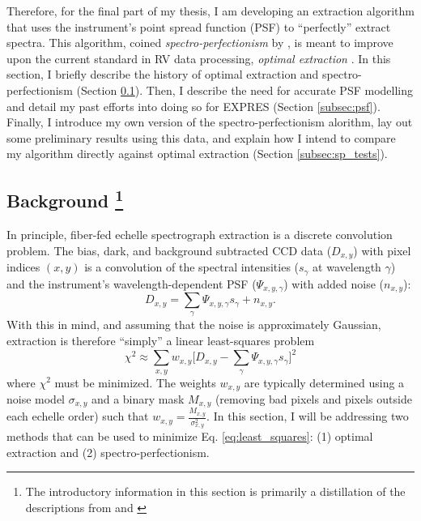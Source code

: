 \documentclass[11pt]{article}
\begin{document}
Therefore, for the final part of my thesis, I am developing an extraction algorithm that uses the instrument's point spread function (PSF) to ``perfectly'' extract spectra. This algorithm, coined \textit{spectro-perfectionism} by \citet{Bolton2009}, is meant to improve upon the current standard in RV data processing, \textit{optimal extraction} \citep{Horne1986}. In this section, I briefly describe the history of optimal extraction and spectro-perfectionism (Section \ref{subsec:spec_perf_intro}). Then, I describe the need for accurate PSF modelling and detail my past efforts into doing so for EXPRES (Section \ref{subsec:psf}). Finally, I introduce my own version of the spectro-perfectionism alorithm, lay out some preliminary results using this data, and explain how I intend to compare my algorithm directly against optimal extraction (Section \ref{subsec:sp_tests}).

\subsection{Background \footnote{The introductory information in this section is primarily a distillation of the descriptions from \citet{Zechmeister2013} and \citet{Bolton2009}}}
\label{subsec:spec_perf_intro}

In principle, fiber-fed echelle spectrograph extraction is a discrete convolution problem. The bias, dark, and background subtracted CCD data ($D_{x,y}$) with pixel indices $(x, y)$ is a convolution of the spectral intensities ($s_\gamma$ at wavelength $\gamma$) and the instrument's wavelength-dependent PSF ($\Psi_{x,y,\gamma}$) with added noise ($n_{x,y}$):
\begin{equation}
    D_{x,y} = \sum_\gamma \Psi_{x,y,\gamma} s_\gamma + n_{x,y}.
\label{eq:convolution}
\end{equation}
With this in mind, and assuming that the noise is approximately Gaussian, extraction is therefore ``simply'' a linear least-squares problem
\begin{equation}
    \chi^2 \approx \sum_{x,y} w_{x,y} \bigg[D_{x,y} - \sum_\gamma \Psi_{x,y,\gamma} s_\gamma \bigg]^2
    \label{eq:least_squares}
\end{equation}
where $\chi^2$ must be minimized. The weights $w_{x,y}$ are typically determined using a noise model $\sigma_{x,y}$ and a binary mask $M_{x,y}$ (removing bad pixels and pixels outside each echelle order) such that $w_{x,y}=\frac{M_{x,y}}{\sigma^2_{x,y}}$. In this section, I will be addressing two methods that can be used to minimize Eq. \ref{eq:least_squares}: (1) optimal extraction and (2) spectro-perfectionism.
\end{document}
